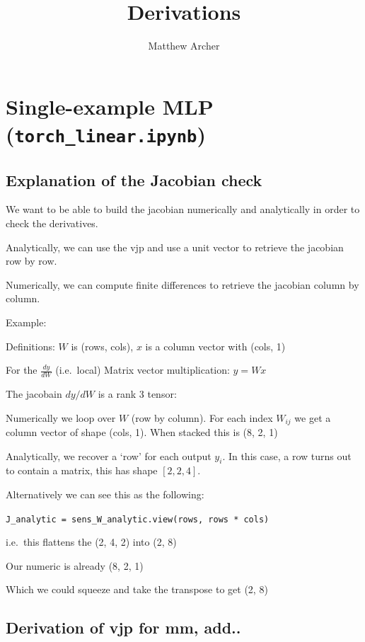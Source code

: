 \documentclass[11pt]{article}
\title{Derivations}
\author{Matthew Archer}
\date{}
\begin{document}
\maketitle
\tableofcontents

\section{Single-example MLP (\texttt{torch\_linear.ipynb})}

\subsection{Explanation of the Jacobian check}

We want to be able to build the jacobian numerically and analytically in order
to check the derivatives.

Analytically, we can use the vjp and use a unit vector to retrieve the jacobian
row by row.

Numerically, we can compute finite differences to retrieve the jacobian column
by column.

Example:

Definitions: $W$ is (rows, cols), $x$ is a column vector with (cols, 1)

For the $\frac{dy}{dW}$ (i.e.\ local) Matrix vector multiplication: $y = W x$

The jacobain $dy / dW$ is a rank 3 tensor:

Numerically we loop over $W$ (row by column). For each index $W_{ij}$ we get a
column vector of shape (cols, 1). When stacked this is (8, 2, 1)

Analytically, we recover a `row' for each output $y_i$. In this case, a row
turns out to contain a matrix, this has shape $[2, 2, 4]$.

\medskip
Alternatively we can see this as the following:

\texttt{J\_analytic = sens\_W\_analytic.view(rows, rows * cols)}

i.e.\ this flattens the (2, 4, 2) into (2, 8)

Our numeric is already (8, 2, 1)

Which we could squeeze and take the transpose to get (2, 8)

\subsection{Derivation of vjp for mm, add..}
\end{document}
